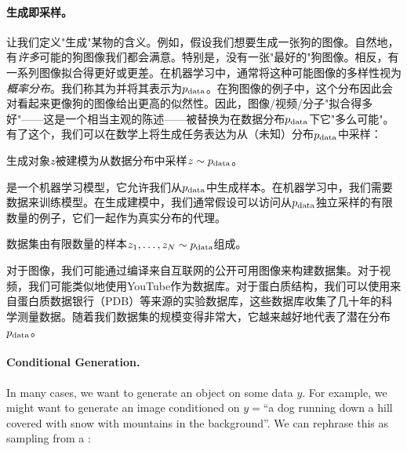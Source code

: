 \paragraph{生成即采样。}让我们定义"生成"某物的含义。例如，假设我们想要生成一张狗的图像。自然地，有\emph{许多}可能的狗图像我们都会满意。特别是，没有一张"最好的"狗图像。相反，有一系列图像拟合得更好或更差。在机器学习中，通常将这种可能图像的多样性视为\emph{概率分布}。我们称其为并将其表示为$p_{\rm{data}}$。在狗图像的例子中，这个分布因此会对看起来更像狗的图像给出更高的似然性。因此，图像/视频/分子"拟合得多好"——这是一个相当主观的陈述——被替换为在数据分布$p_{\rm{data}}$下它"多么可能"。有了这个，我们可以在数学上将生成任务表达为从（未知）分布$p_{\rm{data}}$中采样：
\begin{ideabox}[生成即采样]
    生成对象$z$被建模为从数据分布中采样$z\sim p_{\rm{data}}$。
\end{ideabox}
是一个机器学习模型，它允许我们从$p_{\rm{data}}$中生成样本。在机器学习中，我们需要数据来训练模型。在生成建模中，我们通常假设可以访问从$p_{\rm{data}}$独立采样的有限数量的例子，它们一起作为真实分布的代理。
\begin{ideabox}[数据集]
    数据集由有限数量的样本$z_1, \dots, z_N \sim p_{\rm{data}}$组成。
\end{ideabox}
对于图像，我们可能通过编译来自互联网的公开可用图像来构建数据集。对于视频，我们可能类似地使用YouTube作为数据库。对于蛋白质结构，我们可以使用来自蛋白质数据银行（PDB）等来源的实验数据库，这些数据库收集了几十年的科学测量数据。随着我们数据集的规模变得非常大，它越来越好地代表了潜在分布$p_{\rm{data}}$。

\paragraph{Conditional Generation.} In many cases, we want to generate an object  on some data $y$. For example, we might want to generate an image conditioned on $y=$``a dog running down a hill covered with snow with mountains in the background''. We can rephrase this as sampling from a :

